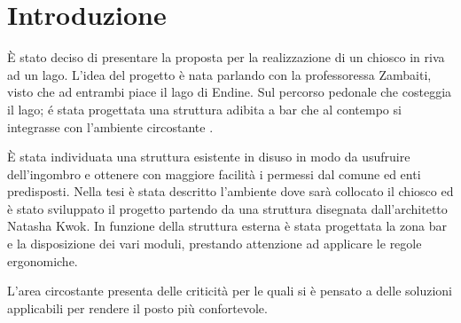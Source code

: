 \section{Introduzione}
È stato deciso di presentare la proposta per la realizzazione di un chiosco in riva ad un lago. L'idea del progetto è nata parlando con la professoressa Zambaiti, visto che ad entrambi piace il lago di Endine. Sul percorso pedonale che costeggia il lago; é stata progettata una struttura adibita a bar che al contempo si integrasse con l’ambiente circostante .

È stata individuata una struttura esistente in disuso in modo da usufruire dell'ingombro e ottenere con maggiore facilità i permessi dal comune ed enti predisposti. Nella tesi è stata descritto l’ambiente dove sarà collocato il chiosco ed è stato sviluppato il progetto partendo da una struttura disegnata dall'architetto Natasha Kwok. In funzione della struttura esterna è stata progettata la zona bar e la disposizione dei vari moduli, prestando attenzione ad applicare le regole ergonomiche.

L'area circostante presenta delle criticità per le quali si è pensato a delle soluzioni applicabili per rendere il posto più confortevole.
